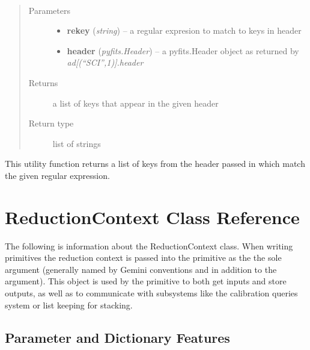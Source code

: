 \documentclass[letterpaper,10pt,english]{sphinxmanual}
\begin{document}
\begin{fulllineitems}
\label{chapter_AstroDataClass:astrodata.data.re_header_keys}~\begin{quote}\begin{description}
\item[{Parameters}] \leavevmode\begin{itemize}
\item {} 
\textbf{rekey} (\emph{string}) -- a regular expresion to match to keys in header

\item {} 
\textbf{header} (\emph{pyfits.Header}) -- a pyfits.Header object as returned by \emph{ad{[}(``SCI'',1){]}.header}

\end{itemize}

\item[{Returns}] \leavevmode
a list of keys that appear in the given header

\item[{Return type}] \leavevmode
list of strings

\end{description}\end{quote}

This utility function returns a list of keys from 
the header passed in which match the given regular expression.

\end{fulllineitems}



\chapter{ReductionContext Class Reference}
\label{chapter_ReductionContextClass:reductioncontext-class-reference}\label{chapter_ReductionContextClass::doc}
The following is information about the ReductionContext class. When writing
primitives the reduction context is passed into the primitive as the the sole
argument (generally named  by
Gemini conventions and in addition to the  argument).
This object is used by the primitive to both get inputs
and store outputs, as well as to communicate with subsystems
like the calibration queries system or list keeping for stacking.


\section{Parameter and Dictionary Features}
\label{chapter_ReductionContextClass:parameter-and-dictionary-features}
\end{document}
